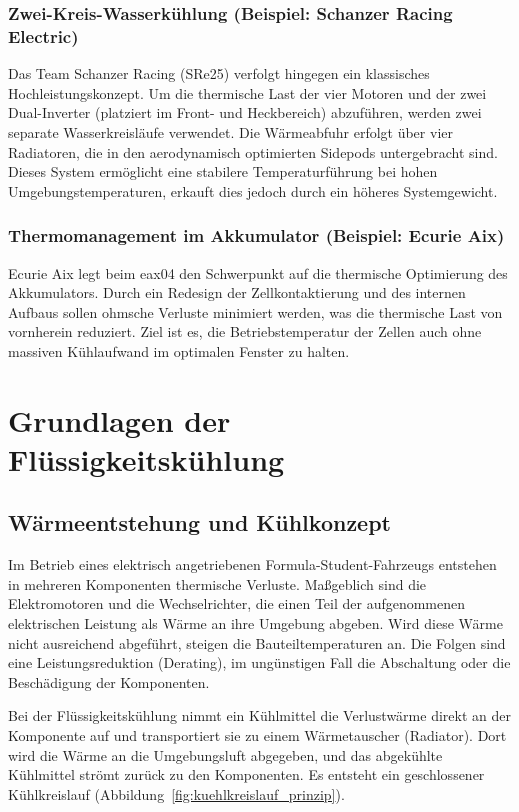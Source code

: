 \subsubsection{Zwei-Kreis-Wasserkühlung (Beispiel: Schanzer Racing Electric)}
Das Team Schanzer Racing (SRe25) verfolgt hingegen ein klassisches Hochleistungskonzept. Um die thermische Last der vier Motoren und der zwei Dual-Inverter (platziert im Front- und Heckbereich) abzuführen, werden zwei separate Wasserkreisläufe verwendet. Die Wärmeabfuhr erfolgt über vier Radiatoren, die in den aerodynamisch optimierten Sidepods untergebracht sind. Dieses System ermöglicht eine stabilere Temperaturführung bei hohen Umgebungstemperaturen, erkauft dies jedoch durch ein höheres Systemgewicht.

\subsubsection{Thermomanagement im Akkumulator (Beispiel: Ecurie Aix)}
Ecurie Aix legt beim eax04 den Schwerpunkt auf die thermische Optimierung des Akkumulators. Durch ein Redesign der Zellkontaktierung und des internen Aufbaus sollen ohmsche Verluste minimiert werden, was die thermische Last von vornherein reduziert. Ziel ist es, die Betriebstemperatur der Zellen auch ohne massiven Kühlaufwand im optimalen Fenster zu halten.

\section{Grundlagen der Flüssigkeitskühlung}
\label{sec:grundlagen_kuehlung}

\subsection{Wärmeentstehung und Kühlkonzept}
\label{subsec:waermeentstehung}

Im Betrieb eines elektrisch angetriebenen Formula-Student-Fahrzeugs entstehen in
mehreren Komponenten thermische Verluste. Maßgeblich sind die Elektromotoren und
die Wechselrichter, die einen Teil der aufgenommenen elektrischen Leistung als
Wärme an ihre Umgebung abgeben. Wird diese Wärme nicht ausreichend abgeführt,
steigen die Bauteiltemperaturen an. Die Folgen sind eine Leistungsreduktion
(Derating), im ungünstigen Fall die Abschaltung oder die Beschädigung der
Komponenten.

Bei der Flüssigkeitskühlung nimmt ein Kühlmittel die Verlustwärme direkt an der
Komponente auf und transportiert sie zu einem Wärmetauscher (Radiator). Dort
wird die Wärme an die Umgebungsluft abgegeben, und das abgekühlte Kühlmittel
strömt zurück zu den Komponenten. Es entsteht ein geschlossener Kühlkreislauf
(Abbildung~\ref{fig:kuehlkreislauf_prinzip}).

